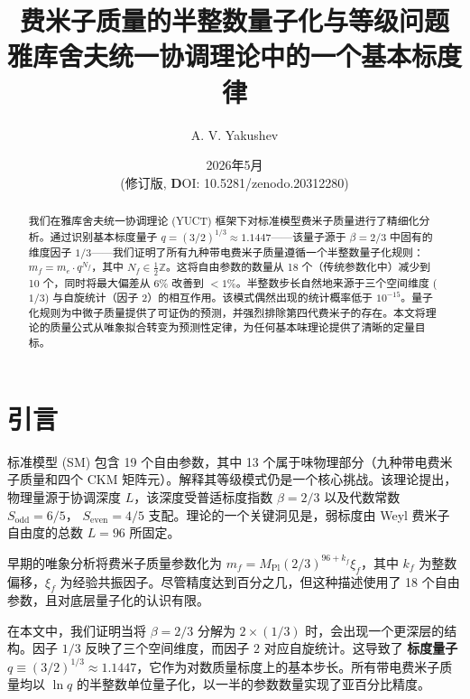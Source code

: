 \documentclass[12pt,a4paper]{article}
\begin{document}
	
	\title{费米子质量的半整数量子化与等级问题 \\ 
		\large 雅库舍夫统一协调理论中的一个基本标度律}
	\author{A. V. Yakushev}
	
	
	\date{2026年5月 \\ (修订版, \textbf DOI: 10.5281/zenodo.20312280)}
	\maketitle
	
	\begin{abstract}
		我们在雅库舍夫统一协调理论 (YUCT) 框架下对标准模型费米子质量进行了精细化分析。通过识别基本标度量子 $q = (3/2)^{1/3} \approx 1.1447$——该量子源于 $\beta = 2/3$ 中固有的维度因子 $1/3$——我们证明了所有九种带电费米子质量遵循一个半整数量子化规则：$m_f = m_e \cdot q^{N_f}$，其中 $N_f \in \frac{1}{2}\mathbb{Z}$。这将自由参数的数量从 18 个（传统参数化中）减少到 10 个，同时将最大偏差从 6\% 改善到 $<1\%$。半整数步长自然地来源于三个空间维度 ($1/3$) 与自旋统计（因子 2）的相互作用。该模式偶然出现的统计概率低于 $10^{-15}$。量子化规则为中微子质量提供了可证伪的预测，并强烈排除第四代费米子的存在。本文将理论的质量公式从唯象拟合转变为预测性定律，为任何基本味理论提供了清晰的定量目标。 \\
		
	\end{abstract}
	
	\section{引言}
	
	标准模型 (SM) 包含 19 个自由参数，其中 13 个属于味物理部分（九种带电费米子质量和四个 CKM 矩阵元）。解释其等级模式仍是一个核心挑战。该理论提出，物理量源于协调深度 $L$，该深度受普适标度指数 $\beta = 2/3$ 以及代数常数 $S_{\mathrm{odd}}=6/5$， $S_{\mathrm{even}}=4/5$ 支配。理论的一个关键洞见是，弱标度由 Weyl 费米子自由度的总数 $L=96$ 所固定。
	
	早期的唯象分析将费米子质量参数化为 $m_f = M_{\mathrm{Pl}}(2/3)^{96+k_f}\xi_f$，其中 $k_f$ 为整数偏移，$\xi_f$ 为经验共振因子。尽管精度达到百分之几，但这种描述使用了 18 个自由参数，且对底层量子化的认识有限。
	
	在本文中，我们证明当将 $\beta = 2/3$ 分解为 $2 \times (1/3)$ 时，会出现一个更深层的结构。因子 $1/3$ 反映了三个空间维度，而因子 $2$ 对应自旋统计。这导致了 \textbf{标度量子} $q \equiv (3/2)^{1/3} \approx 1.1447$，它作为对数质量标度上的基本步长。所有带电费米子质量均以 $\ln q$ 的半整数单位量子化，以一半的参数数量实现了亚百分比精度。
	
\end{document}
